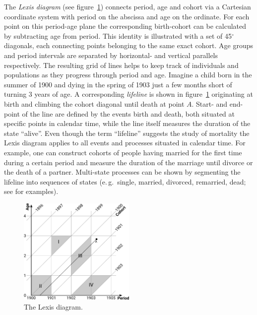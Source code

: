 \documentclass[parskip=half]{scrartcl}
\begin{document}
The \emph{Lexis diagram} (see figure~\ref{fig:lexis}) connects period, age and cohort via a Cartesian coordinate system with period on the abscissa and age on the ordinate. For each point on this period-age plane the corresponding birth-cohort can be calculated by subtracting age from period. This identity is illustrated with a set of 45$^\circ$ diagonals, each connecting points belonging to the same exact cohort. Age groups and period intervals are separated by horizontal- and vertical parallels respectively. The resulting grid of lines helps to keep track of individuals and populations as they progress through period and age. Imagine a child born in the summer of 1900 and dying in the spring of 1903 just a few months short of turning 3 years of age. A corresponding \emph{lifeline} is shown in figure~\ref{fig:lexis} originating at birth and climbing the cohort diagonal until death at point $A$. Start- and end-point of the line are defined by the events birth and death, both situated at specific points in calendar time, while the line itself measures the duration of the state \enquote{alive}. Even though the term \enquote{lifeline} suggests the study of mortality the Lexis diagram applies to all events and processes situated in calendar time. For example, one can construct cohorts of people having married for the first time during a certain period and measure the duration of the marriage until divorce or the death of a partner. Multi-state processes can be shown by segmenting the lifeline into sequences of states (e.\,g.~single, married, divorced, remarried, dead; see \textcite{Willekens2014} for examples).

\begin{figure}[!htb]
  \centering
  \includegraphics[width = 0.5\textwidth]{./fig/lexis_grid.pdf}
  \caption{The Lexis diagram.}
  \label{fig:lexis}
\end{figure}
\end{document}
